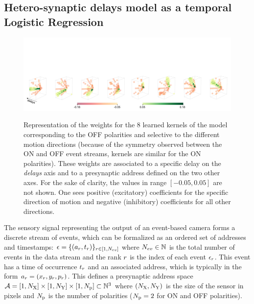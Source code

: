 \documentclass[default]{sn-jnl}%
\theoremstyle{thmstyleone}%
\theoremstyle{thmstyletwo}%
\theoremstyle{thmstylethree}%
\begin{document}
\subsection{Hetero-synaptic delays model as a temporal Logistic Regression}
%
\begin{figure}[ht!]
    {\centering
    \vspace{-3cm}
    \includegraphics[width=\linewidth]{figures/3D_kernels_oneline.png}
    }
    \caption{
    	Representation of the weights for the $8$ learned kernels of the model corresponding to the OFF polarities and selective to the different motion directions
	(because of the symmetry observed between the ON and OFF event streams, kernels are similar for the ON polarities). These weights are associated to a specific delay on the \textit{delays} axis and to a presynaptic address defined on the two other axes.
	For the sake of clarity, the values in range $[-0.05, 0.05]$ are not shown. One sees positive (excitatory) coefficients for the specific direction of motion and negative (inhibitory) coefficients for all other directions.
	}
    \label{fig:kernels}
\end{figure} 
%
The sensory signal representing the output of an event-based camera forms a discrete stream of events, which can be formalized as an ordered set of addresses and timestamps: $\epsilon = \{(a_r, t_r)\}_{r \in [1,N_{ev}]}$ where $N_{ev} \in \mathbb{N} $ is the total number of events in the data stream and the rank $r$ is the index of each event $\epsilon_r$. 
This event has a time of occurrence $t_r$  and an associated address, which is typically in the form $a_r=(x_r, y_r, p_r)$.
This defines a presynaptic address space $\mathcal{A} = [1, N_\text{X}]\times[1, N_\text{Y}] \times [1, N_\text{p}] \subset \mathbb{N}^3$ where $(N_\text{X}, N_\text{Y})$ is the size of the sensor in pixels and $N_\text{p}$ is the number of polarities  ($N_\text{p}=2$ for ON and OFF polarities).
\end{document}
